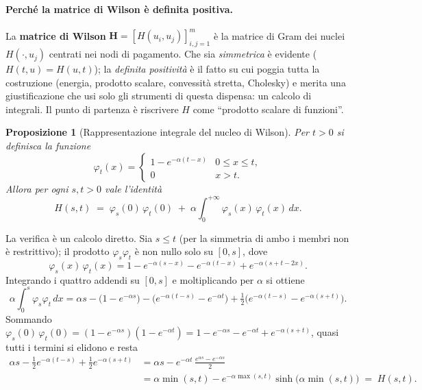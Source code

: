 \documentclass[11pt,a4paper]{article}
\theoremstyle{plain}
\newtheorem{proposizione}[teorema]{Proposizione}
\theoremstyle{definition}
\theoremstyle{remark}
\newcommand{\Hmat}{\mathbf{H}}
\begin{document}
\paragraph{Perch\'e la matrice di Wilson \`e definita positiva.}
La \textbf{matrice di Wilson} $\Hmat = [H(u_i,u_j)]_{i,j=1}^{m}$ \`e la matrice di Gram dei
nuclei $H(\cdot,u_j)$ centrati nei nodi di pagamento. Che sia \emph{simmetrica} \`e evidente
($H(t,u)=H(u,t)$); la \emph{definita positivit\`a} \`e il fatto su cui poggia tutta la
costruzione (energia, prodotto scalare, convessit\`a stretta, Cholesky) e merita una
giustificazione che usi solo gli strumenti di questa dispensa: un calcolo di integrali.
Il punto di partenza \`e riscrivere $H$ come ``prodotto scalare di funzioni''.

\begin{proposizione}[Rappresentazione integrale del nucleo di Wilson]
\label{prop:H-int}
Per $t>0$ si definisca la funzione
\[
  \varphi_t(x) =
  \begin{cases}
    1-e^{-\alpha(t-x)} & 0\le x\le t,\\[2pt]
    0 & x>t .
  \end{cases}
\]
Allora per ogni $s,t>0$ vale l'identit\`a
\begin{equation}
  H(s,t) \;=\; \varphi_s(0)\,\varphi_t(0)
  \;+\; \alpha\!\int_0^{+\infty}\!\varphi_s(x)\,\varphi_t(x)\,dx .
  \label{eq:H-int}
\end{equation}
\end{proposizione}

La verifica \`e un calcolo diretto. Sia $s\le t$ (per la simmetria di ambo i membri non \`e
restrittivo); il prodotto $\varphi_s\varphi_t$ \`e non nullo solo su $[0,s]$, dove
\[
  \varphi_s(x)\,\varphi_t(x)
  = 1 - e^{-\alpha(s-x)} - e^{-\alpha(t-x)} + e^{-\alpha(s+t-2x)} .
\]
Integrando i quattro addendi su $[0,s]$ e moltiplicando per $\alpha$ si ottiene
\[
  \alpha\!\int_0^{s}\!\varphi_s\varphi_t\,dx
  = \alpha s - \bigl(1-e^{-\alpha s}\bigr) - \bigl(e^{-\alpha(t-s)}-e^{-\alpha t}\bigr)
    + \tfrac12\bigl(e^{-\alpha(t-s)}-e^{-\alpha(s+t)}\bigr) .
\]
Sommando $\varphi_s(0)\,\varphi_t(0) = (1-e^{-\alpha s})(1-e^{-\alpha t})
= 1 - e^{-\alpha s} - e^{-\alpha t} + e^{-\alpha(s+t)}$, quasi tutti i termini si elidono e resta
\begin{align*}
  \alpha s - \tfrac12 e^{-\alpha(t-s)} + \tfrac12 e^{-\alpha(s+t)}
  &= \alpha s - e^{-\alpha t}\,\frac{e^{\alpha s}-e^{-\alpha s}}{2}\\
  &= \alpha\min(s,t) - e^{-\alpha\max(s,t)}\sinh\!\bigl(\alpha\min(s,t)\bigr)
  \;=\; H(s,t) .
\end{align*}
\end{document}
